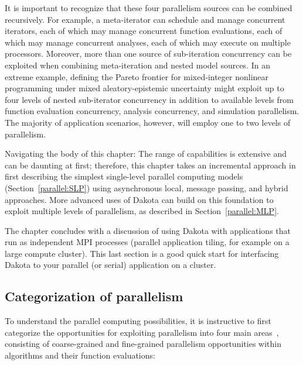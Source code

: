 It is important to recognize that these four parallelism sources can
be combined recursively.  For example, a meta-iterator can schedule
and manage concurrent iterators, each of which may manage concurrent
function evaluations, each of which may manage concurrent analyses,
each of which may execute on multiple processors.  Moreover, more than
one source of sub-iteration concurrency can be exploited when
combining meta-iteration and nested model sources.  In an extreme
example, defining the Pareto frontier for mixed-integer nonlinear
programming under mixed aleatory-epistemic uncertainty might exploit
up to four levels of nested sub-iterator concurrency in addition to
available levels from function evaluation concurrency, analysis
concurrency, and simulation parallelism.  The majority of application
scenarios, however, will employ one to two levels of parallelism.

Navigating the body of this chapter: The range of capabilities is
extensive and can be daunting at first; therefore, this chapter takes
an incremental approach in first describing the simplest single-level
parallel computing models (Section~\ref{parallel:SLP}) using
asynchronous local, message passing, and hybrid approaches.  More
advanced uses of Dakota can build on this foundation to exploit
multiple levels of parallelism, as described in
Section~\ref{parallel:MLP}.

The chapter concludes with a discussion of using Dakota with
applications that run as independent MPI processes (parallel
application tiling, for example on a large compute cluster).  This
last section is a good quick start for interfacing Dakota to your
parallel (or serial) application on a cluster.



\subsection{Categorization of parallelism}\label{parallel:overview:cat}

To understand the parallel computing possibilities, it is instructive
to first categorize the opportunities for exploiting parallelism into
four main areas~\cite{Eld98a}, consisting of coarse-grained and
fine-grained parallelism opportunities within algorithms and their
function evaluations:

